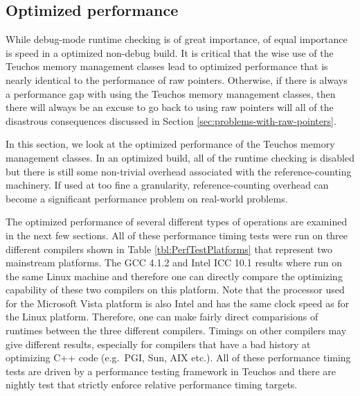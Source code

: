 \documentclass[pdf,ps2pdf,11pt]{SANDreport}
\begin{document}
%
{}\subsection{Optimized performance}
\label{sec:optimized-performance}
%

While debug-mode runtime checking is of great importance, of equal
importance is speed in a optimized non-debug build.  It is critical
that the wise use of the Teuchos memory management classes lead to
optimized performance that is nearly identical to the performance of
raw pointers.  Otherwise, if there is always a performance gap with
using the Teuchos memory management classes, then there will always be
an excuse to go back to using raw pointers will all of the disastrous
consequences discussed in Section
{}\ref{sec:problems-with-raw-pointers}.

In this section, we look at the optimized performance of the Teuchos
memory management classes.  In an optimized build, all of the runtime
checking is disabled but there is still some non-trivial overhead
associated with the reference-counting machinery.  If used at too fine
a granularity, reference-counting overhead can become a significant
performance problem on real-world problems.

The optimized performance of several different types of operations are
examined in the next few sections.  All of these performance timing
tests were run on three different compilers shown in Table
{}\ref{tbl:PerfTestPlatforms} that represent two mainstream platforms.
The GCC 4.1.2 and Intel ICC 10.1 results where run on the same Linux
machine and therefore one can directly compare the optimizing
capability of these two compilers on this platform.  Note that the
processor used for the Microsoft Vista platform is also Intel and has
the same clock speed as for the Linux platform.  Therefore, one can
make fairly direct comparisions of runtimes between the three
different compilers.  Timings on other compilers may give different
results, especially for compilers that have a bad history at
optimizing C++ code (e.g.\ PGI, Sun, AIX etc.).  All of these
performance timing tests are driven by a performance testing framework
in Teuchos and there are nightly test that strictly enforce relative
performance timing targets.
\end{document}
